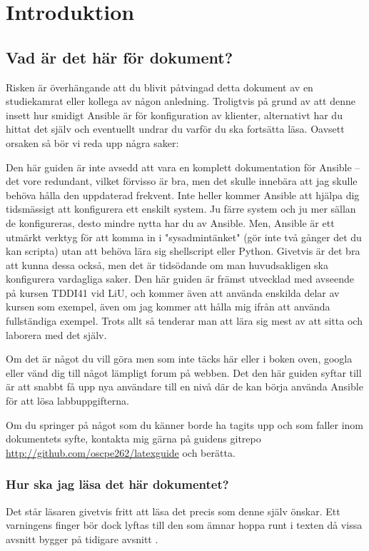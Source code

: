 \section{Introduktion}
\subsection{Vad är det här för dokument?}
Risken är överhängande att du blivit påtvingad detta dokument av en studiekamrat eller kollega av någon anledning. 
Troligtvis på grund av att denne insett hur smidigt Ansible är för konfiguration av klienter, 
alternativt har du hittat det själv och eventuellt undrar du varför du ska fortsätta läsa. Oavsett orsaken så bör vi reda upp några saker:

Den här guiden är inte avsedd att vara en komplett dokumentation för Ansible -- det vore redundant, vilket förvisso är bra, men det skulle innebära att jag skulle behöva hålla den uppdaterad frekvent.
Inte heller kommer Ansible att hjälpa dig tidsmässigt att konfigurera ett enskilt system. Ju färre system och ju mer sällan de konfigureras, desto mindre nytta har du av Ansible.
Men, Ansible är ett utmärkt verktyg för att komma in i "sysadmintänket" (gör inte två gånger det du kan scripta) utan att behöva lära sig shellscript eller Python. Givetvis är det bra att kunna dessa också, men det är tidsödande
om man huvudsakligen ska konfigurera vardagliga saker.
Den här guiden är främst utvecklad med avseende på kursen TDDI41 vid LiU, och kommer även att använda enskilda delar av kursen som exempel, även om jag kommer att hålla mig ifrån att använda fullständiga exempel.
Trots allt så tenderar man att lära sig mest av att sitta och laborera med det själv.

Om det är något du vill göra men som inte täcks här eller i boken oven, googla eller vänd dig till något lämpligt forum på webben. 
Det den här guiden syftar till är att snabbt få upp nya användare till en nivå där de kan börja använda Ansible för att lösa labbuppgifterna.

Om du springer på något som du känner borde ha tagits upp och som faller inom dokumentets syfte, kontakta mig gärna på guidens gitrepo \href{http://github.com/oscpe262/latexguide}{\url{http://github.com/oscpe262/latexguide}} och berätta.

\subsubsection{Hur ska jag läsa det här dokumentet?}
Det står läsaren givetvis fritt att läsa det precis som denne själv önskar. Ett varningens finger bör dock lyftas till den som ämnar hoppa runt i texten då vissa avsnitt bygger på tidigare avsnitt
.%

